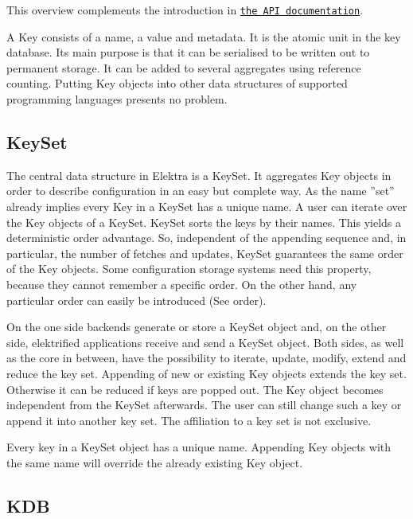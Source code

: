 This overview complements the introduction in \href{http://doc.libelektra.org/api/current/html/}{\tt the A\+P\+I documentation}.

A {\ttfamily Key} consists of a name, a value and metadata. It is the atomic unit in the key database. Its main purpose is that it can be serialised to be written out to permanent storage. It can be added to several aggregates using reference counting. Putting {\ttfamily Key} objects into other data structures of supported programming languages presents no problem.

\subsection*{Key\+Set}

The central data structure in Elektra is a {\ttfamily Key\+Set}. It aggregates {\ttfamily Key} objects in order to describe configuration in an easy but complete way. As the name ''set'' already implies every {\ttfamily Key} in a {\ttfamily Key\+Set} has a unique name. A user can iterate over the {\ttfamily Key} objects of a {\ttfamily Key\+Set}. {\ttfamily Key\+Set} sorts the keys by their names. This yields a deterministic order advantage. So, independent of the appending sequence and, in particular, the number of fetches and updates, {\ttfamily Key\+Set} guarantees the same order of the {\ttfamily Key} objects. Some configuration storage systems need this property, because they cannot remember a specific order. On the other hand, any particular order can easily be introduced (See order).

On the one side backends generate or store a {\ttfamily Key\+Set} object and, on the other side, elektrified applications receive and send a {\ttfamily Key\+Set} object. Both sides, as well as the core in between, have the possibility to iterate, update, modify, extend and reduce the key set. Appending of new or existing {\ttfamily Key} objects extends the key set. Otherwise it can be reduced if keys are popped out. The {\ttfamily Key} object becomes independent from the {\ttfamily Key\+Set} afterwards. The user can still change such a key or append it into another key set. The affiliation to a key set is not exclusive.

Every key in a {\ttfamily Key\+Set} object has a unique name. Appending {\ttfamily Key} objects with the same name will override the already existing {\ttfamily Key} object.

\subsection*{K\+D\+B}

